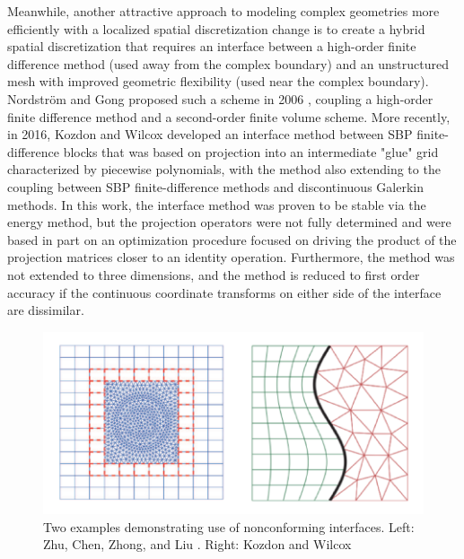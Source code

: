 Meanwhile, another attractive approach to modeling complex geometries more efficiently
with a localized spatial discretization change is to create a hybrid spatial
discretization that requires an interface between a high-order finite difference
method (used away from the complex boundary) and an unstructured mesh with
improved geometric flexibility (used near the complex boundary). Nordstr{\"o}m and Gong
proposed such a scheme in 2006 \cite{nordstrom2006stable}, coupling a high-order finite difference method
and a second-order finite volume scheme. More recently, in 2016, Kozdon and Wilcox
\cite{kozdon2016stable} developed an interface method between SBP finite-difference
blocks that was based on projection into an intermediate "glue" grid characterized by
piecewise polynomials, with the method also extending to the coupling between SBP
finite-difference methods and discontinuous Galerkin methods. In this work, the interface method was proven to be stable via the energy method, but the projection operators were
not fully determined and were based in part on an optimization procedure focused on
driving the product of the projection matrices closer to an identity operation.
Furthermore, the method was not extended to three dimensions, and the method is reduced
to first order accuracy if the continuous coordinate transforms on either side of the
interface are dissimilar.

\begin{figure}
\centering
\includegraphics[width=0.8\linewidth,trim=4 4 4 4,clip]{figures/nonconforming_samples.png}
\caption{Two examples demonstrating use of nonconforming interfaces. Left: Zhu, Chen, Zhong, and Liu \cite{zhu2011hybrid}.
	 Right: Kozdon and Wilcox \cite{kozdon2016stable}}
\label{fig:nonconforming_samples}
\end{figure}

